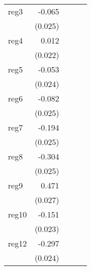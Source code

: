 {\begin{longtable}{l*{4}{D{.}{.}{-1}}}
\addlinespace
reg3        &      -0.065\sym{**} &                     &                     &                     \\
            &     (0.025)         &                     &                     &                     \\
\addlinespace
reg4        &       0.012         &                     &                     &                     \\
            &     (0.022)         &                     &                     &                     \\
\addlinespace
reg5        &      -0.053\sym{*}  &                     &                     &                     \\
            &     (0.024)         &                     &                     &                     \\
\addlinespace
reg6        &      -0.082\sym{***}&                     &                     &                     \\
            &     (0.025)         &                     &                     &                     \\
\addlinespace
reg7        &      -0.194\sym{***}&                     &                     &                     \\
            &     (0.025)         &                     &                     &                     \\
\addlinespace
reg8        &      -0.304\sym{***}&                     &                     &                     \\
            &     (0.025)         &                     &                     &                     \\
\addlinespace
reg9        &       0.471\sym{***}&                     &                     &                     \\
            &     (0.027)         &                     &                     &                     \\
\addlinespace
reg10       &      -0.151\sym{***}&                     &                     &                     \\
            &     (0.023)         &                     &                     &                     \\
\addlinespace
reg12       &      -0.297\sym{***}&                     &                     &                     \\
            &     (0.024)         &                     &                     &                     \\

\end{longtable}}
